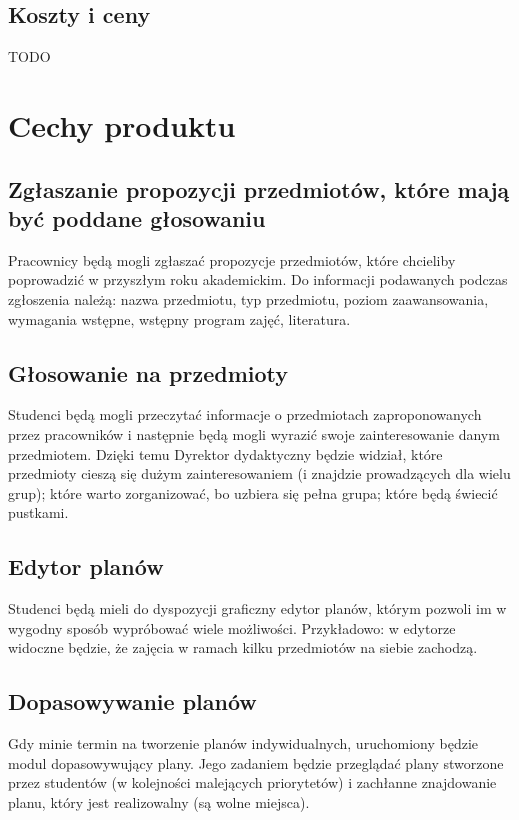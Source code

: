 \documentclass[11pt,leqno]{article}
\begin{document}
\subsection{Koszty i ceny}
TODO

\section{Cechy produktu}

\subsection{Zgłaszanie propozycji przedmiotów, które mają być poddane głosowaniu}
Pracownicy będą mogli zgłaszać propozycje przedmiotów, które chcieliby poprowadzić w przyszłym roku akademickim. Do informacji podawanych podczas zgłoszenia należą: nazwa przedmiotu, typ przedmiotu, poziom zaawansowania, wymagania wstępne, wstępny program zajęć, literatura.

\subsection{Głosowanie na przedmioty}
Studenci będą mogli przeczytać informacje o przedmiotach zaproponowanych przez pracowników i następnie będą mogli wyrazić swoje zainteresowanie danym przedmiotem. Dzięki temu Dyrektor dydaktyczny będzie widział, które przedmioty cieszą się dużym zainteresowaniem (i znajdzie prowadzących dla wielu grup); które warto zorganizować, bo uzbiera się pełna grupa; które będą świecić pustkami.

\subsection{Edytor planów}
Studenci będą mieli do dyspozycji graficzny edytor planów, którym pozwoli im w wygodny sposób wypróbować wiele możliwości. Przykładowo: w edytorze widoczne będzie, że zajęcia w ramach kilku przedmiotów na siebie zachodzą.

\subsection{Dopasowywanie planów}
Gdy minie termin na tworzenie planów indywidualnych, uruchomiony będzie modul dopasowywujący plany. Jego zadaniem będzie przeglądać plany stworzone przez studentów (w kolejności malejących priorytetów) i zachłanne znajdowanie planu, który jest realizowalny (są wolne miejsca).
\end{document}
